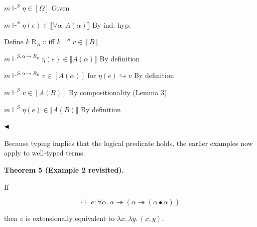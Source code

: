  
  
\par   $m\Vdash^{S}\eta\in[\Omega]$ Given\quad  
 
\par   $m\Vdash^{S}\eta(e)\in\llbracket\forall\alpha.\,A(\alpha)\rrbracket$ By ind. hyp.\quad  
 
\par  Define $k\mathrel{R}_{B}v$ iff $k\Vdash^{S}v\in[B]$\quad  
 
\par   $m\Vdash^{S,\alpha\mapsto R_{B}}\eta(e)\in\llbracket A(\alpha)\rrbracket$ By definition\quad  
 
\par   $m\Vdash^{S,\alpha\mapsto R_{B}}v\in[A(\alpha)]$ for $\eta(e)\mathrel{\hookrightarrow}v$ By definition\quad  
 
\par   $m\Vdash^{S}v\in[A(B)]$ By compositionality (Lemma 3)\quad  
 
\par   $m\Vdash^{S}\eta(e)\in\llbracket A(B)\rrbracket$ By definition\quad  
  
   
$\hfill\blacktriangleleft$\par
 
 
 
Because typing implies that the logical predicate holds, the earlier examples now apply to well-typed terms.\par
 
 
 
\par\medskip\noindent\textbf{Theorem 5 (Example 2 revisited).}\par
 
 
If\par
  
\par  \quad  \[\cdot\vdash e:\forall\alpha.\,\alpha\twoheadrightarrow(\alpha\twoheadrightarrow(\alpha\bullet\alpha))\]\quad  \quad  
  
then $e$ is extensionally equivalent to $\lambda x.\,\lambda y.\,(x,y)$.\par
 
